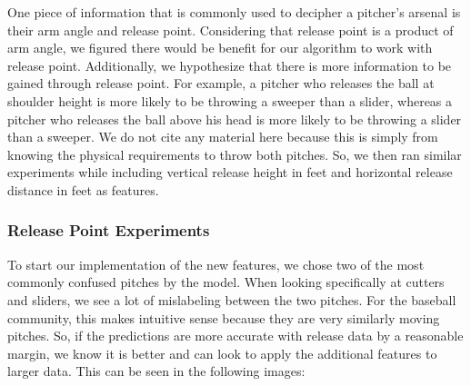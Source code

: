 \documentclass{article}
\begin{document}
One piece of information that is commonly used to decipher a pitcher's arsenal is their arm 
angle and release point. Considering that release point is a product of arm angle, we figured 
there would be benefit for our algorithm to work with release point. Additionally, we 
hypothesize that there is more information to be gained through release point. For example, 
a pitcher who releases the ball at shoulder height is more likely to be throwing a 
sweeper than a slider, whereas a pitcher who releases the ball above his head is more likely 
to be throwing a slider than a sweeper. We do not cite any material here because this is simply 
from knowing the physical requirements to throw both pitches. So, we then ran similar experiments 
while including vertical release height in feet and horizontal release distance in feet as features.

\subsubsection{Release Point Experiments}

To start our implementation of the new features, we chose two of the most commonly confused pitches by the model.
When looking specifically at cutters and sliders, we see a lot of mislabeling between 
the two pitches. For the baseball community, this makes intuitive sense because they are very similarly moving pitches. 
So, if the predictions are more accurate with release data by a reasonable margin, we know it is better 
and can look to apply the additional features to larger data. This can be seen in the following images:
\end{document}
